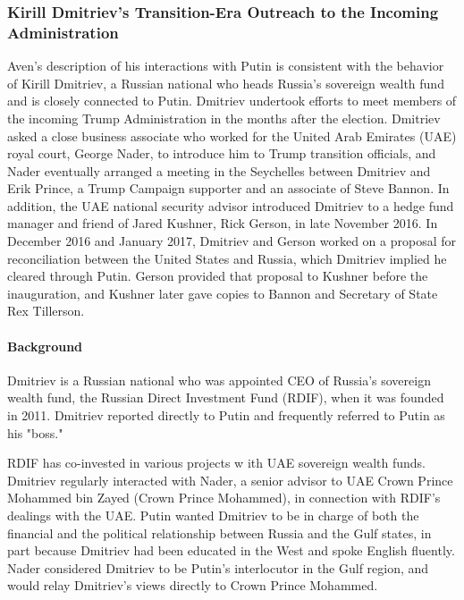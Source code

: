 \subsubsection{Kirill Dmitriev's Transition-Era Outreach to the Incoming Administration}

Aven's description of his interactions with Putin is consistent with the behavior of Kirill Dmitriev, a Russian national who heads Russia's sovereign wealth fund and is closely connected to Putin.
Dmitriev undertook efforts to meet members of the incoming Trump Administration in the months after the election.
Dmitriev asked a close business associate who worked for the United Arab Emirates (UAE) royal court, George Nader, to introduce him to Trump transition officials, and Nader eventually arranged a meeting in the Seychelles between Dmitriev and Erik Prince, a Trump Campaign supporter and an associate of Steve Bannon.%
In addition, the UAE national security advisor introduced Dmitriev to a hedge fund manager and friend of Jared Kushner, Rick Gerson, in late November 2016.
In December 2016 and January 2017, Dmitriev and Gerson worked on a proposal for reconciliation between the United States and Russia, which Dmitriev implied he cleared through Putin.
Gerson provided that proposal to Kushner before the inauguration, and Kushner later gave copies to Bannon and Secretary of State Rex Tillerson.

\paragraph{Background}

Dmitriev is a Russian national who was appointed CEO of Russia's sovereign wealth fund, the Russian Direct Investment Fund (RDIF), when it was founded in 2011.%
Dmitriev reported directly to Putin and frequently referred to Putin as his "boss."%

RDIF has co-invested in various projects w ith UAE sovereign wealth funds.%
Dmitriev regularly interacted with Nader, a senior advisor to UAE Crown Prince Mohammed bin Zayed (Crown Prince Mohammed), in connection with RDIF's dealings with the UAE.%
Putin wanted Dmitriev to be in charge of both the financial and the political relationship between Russia and the Gulf states, in part because Dmitriev had been educated in the West and spoke English fluently.%
Nader considered Dmitriev to be Putin's interlocutor in the Gulf region, and would relay Dmitriev's views directly to Crown Prince Mohammed.%

